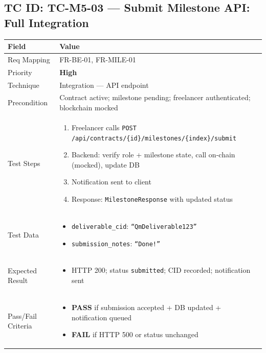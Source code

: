 \documentclass[12pt,a4paper]{article}
\newcommand{\sevhigh}{\textcolor{severityhigh}{\textbf{High}}}
\newcommand{\passresult}{\textcolor{passgreen}{\textbf{PASS}}}
\newcommand{\failresult}{\textcolor{failred}{\textbf{FAIL}}}
\begin{document}
\vspace{0.8cm}

\subsection{TC ID: TC-M5-03 --- Submit Milestone API: Full Integration}

\begin{tabular}{|p{}|p{}|}
\hline
\rowcolor{lightblue} \textbf{Field} & \textbf{Value} \\
\hline
Req Mapping & FR-BE-01, FR-MILE-01 \\
\hline
Priority & \sevhigh \\
\hline
Technique & Integration --- API endpoint \\
\hline
Precondition & Contract active; milestone pending; freelancer authenticated; blockchain mocked \\
\hline
Test Steps &
\begin{enumerate}[nosep, leftmargin=*]
  \item Freelancer calls \texttt{POST /api/contracts/\{id\}/milestones/\{index\}/submit}
  \item Backend: verify role + milestone state, call on-chain (mocked), update DB
  \item Notification sent to client
  \item Response: \texttt{MilestoneResponse} with updated status
\end{enumerate} \\
\hline
Test Data &
\begin{itemize}[nosep, leftmargin=*]
  \item \texttt{deliverable\_cid}: \texttt{``QmDeliverable123''}
  \item \texttt{submission\_notes}: \texttt{``Done!''}
\end{itemize} \\
\hline
Expected Result &
\begin{itemize}[nosep, leftmargin=*]
  \item HTTP 200; status \texttt{submitted}; CID recorded; notification sent
\end{itemize} \\
\hline
Pass/Fail Criteria &
\begin{itemize}[nosep, leftmargin=*]
  \item \passresult{} if submission accepted + DB updated + notification queued
  \item \failresult{} if HTTP 500 or status unchanged
\end{itemize} \\
\hline
\end{tabular}
\end{document}
